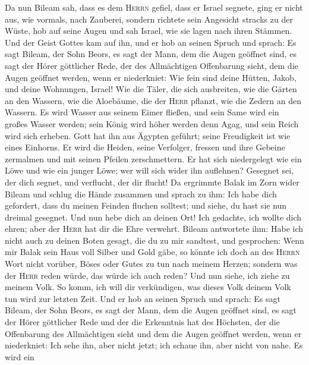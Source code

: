  Da nun Bileam sah, dass es dem \textsc{Herrn} gefiel,
dass er Israel segnete, ging er nicht aus, wie vormals, nach Zauberei,
sondern richtete sein Angesicht stracks zu der Wüste,  hob
auf seine Augen und sah Israel, wie sie lagen nach ihren Stämmen. Und
der Geist Gottes kam auf ihn,  und er hob an seinen Spruch
und sprach: Es sagt Bileam, der Sohn Beors, es sagt der Mann, dem die
Augen geöffnet sind,  es sagt der Hörer göttlicher Rede,
der des Allmächtigen Offenbarung sieht, dem die Augen geöffnet werden,
wenn er niederkniet:  Wie fein sind deine Hütten, Jakob,
und deine Wohnungen, Israel!  Wie die Täler, die sich
ausbreiten, wie die Gärten an den Wassern, wie die Aloebäume, die der
\textsc{Herr} pflanzt, wie die Zedern an den Wassern.  Es
wird Wasser aus seinem Eimer fließen, und sein Same wird ein großes
Wasser werden; sein König wird höher werden denn Agag, und sein Reich
wird sich erheben.  Gott hat ihn aus Ägypten geführt;
seine Freudigkeit ist wie eines Einhorns. Er wird die Heiden, seine
Verfolger, fressen und ihre Gebeine zermalmen und mit seinen Pfeilen
zerschmettern.  Er hat sich niedergelegt wie ein Löwe und
wie ein junger Löwe; wer will sich wider ihn auflehnen? Gesegnet sei,
der dich segnet, und verflucht, der dir flucht!  Da
ergrimmte Balak im Zorn wider Bileam und schlug die Hände zusammen und
sprach zu ihm: Ich habe dich gefordert, dass du meinen Feinden fluchen
solltest; und siehe, du hast sie nun dreimal gesegnet. 
Und nun hebe dich an deinen Ort! Ich gedachte, ich wollte dich ehren;
aber der \textsc{Herr} hat dir die Ehre verwehrt.  Bileam
antwortete ihm: Habe ich nicht auch zu deinen Boten gesagt, die du zu
mir sandtest, und gesprochen:  Wenn mir Balak sein Haus
voll Silber und Gold gäbe, so könnte ich doch an des \textsc{Herrn} Wort
nicht vorüber, Böses oder Gutes zu tun nach meinem Herzen; sondern was
der \textsc{Herr} reden würde, das würde ich auch reden? 
Und nun siehe, ich ziehe zu meinem Volk. So komm, ich will dir
verkündigen, was dieses Volk deinem Volk tun wird zur letzten Zeit.
 Und er hob an seinen Spruch und sprach: Es sagt Bileam,
der Sohn Beors, es sagt der Mann, dem die Augen geöffnet sind,
 es sagt der Hörer göttlicher Rede und der die Erkenntnis
hat des Höchsten, der die Offenbarung des Allmächtigen sieht und dem die
Augen geöffnet werden, wenn er niederkniet:  Ich sehe
ihn, aber nicht jetzt; ich schaue ihn, aber nicht von nahe. Es wird ein
